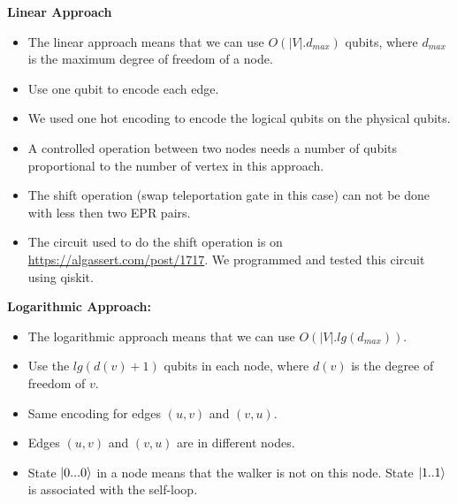 \documentclass{article}
\begin{document}
    \textbf{Linear Approach}
    \begin{itemize}
        \item The linear approach means that we can use $O(|V|.d_{max})$ qubits,  where $d_{max}$ is the maximum degree of freedom of a node.
        \item Use one qubit to encode each edge.
        \item We used one hot encoding to encode the logical qubits on the physical qubits.
        \item A controlled operation between two nodes needs a number of qubits proportional to the number of vertex in this approach.
        \item The shift operation (swap teleportation gate in this case) can not be done with less then two EPR pairs.
        \item The circuit used to do the shift operation is on \hyperlink{https://algassert.com/post/1717}{https://algassert.com/post/1717}. We programmed and tested this circuit using qiskit.

        
        
    \end{itemize}

    \textbf{Logarithmic Approach:}\\
    \begin{itemize}
        \item The logarithmic approach means that we can use $O(|V|.lg(d_{max}))$.
        \item Use the $lg(d(v)+1)$ qubits in each node, where $d(v)$ is the degree of freedom of $v$. 
        \item Same encoding for edges $(u,v)$ and $(v,u)$.
        \item Edges $(u,v)$ and $(v,u)$ are in different nodes.
        \item State $\ket{0...0}$ in a node means that the walker is not on this node. State $\ket{1..1}$ is associated with the self-loop.
            
    \end{itemize} 
\end{document}
